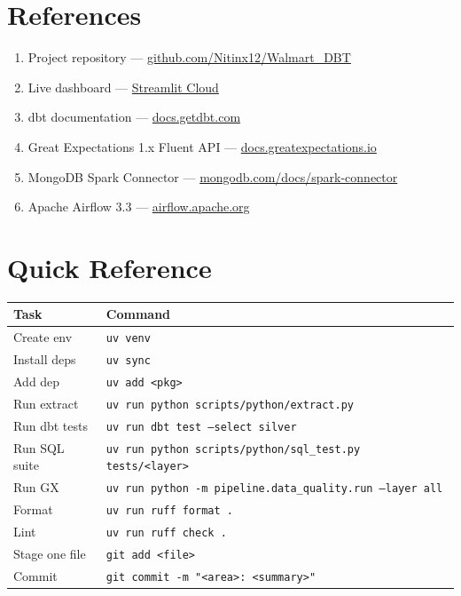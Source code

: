 \documentclass[11pt,a4paper]{article}
\begin{document}
\section*{References}
\begin{enumerate}[leftmargin=1.6em,itemsep=2pt]
  \item Project repository — \href{https://github.com/Nitinx12/Walmart_DBT}{github.com/Nitinx12/Walmart\_DBT}
  \item Live dashboard — \href{https://walmartdbt-b3fdfqwyky3ghzr5syyxtu.streamlit.app/}{Streamlit Cloud}
  \item dbt documentation — \href{https://docs.getdbt.com}{docs.getdbt.com}
  \item Great Expectations 1.x Fluent API — \href{https://docs.greatexpectations.io}{docs.greatexpectations.io}
  \item MongoDB Spark Connector — \href{https://www.mongodb.com/docs/spark-connector/}{mongodb.com/docs/spark-connector}
  \item Apache Airflow 3.3 — \href{https://airflow.apache.org/docs/apache-airflow/3.3.0/}{airflow.apache.org}
\end{enumerate}

\appendix
\section{Quick Reference}

\begin{center}
\begin{longtable}{l l}
\toprule
Task & Command \\
\midrule
\endhead
Create env & \texttt{uv venv} \\
Install deps & \texttt{uv sync} \\
Add dep & \texttt{uv add <pkg>} \\
Run extract & \texttt{uv run python scripts/python/extract.py} \\
Run dbt tests & \texttt{uv run dbt test --select silver} \\
Run SQL suite & \texttt{uv run python scripts/python/sql\_test.py tests/<layer>} \\
Run GX & \texttt{uv run python -m pipeline.data\_quality.run --layer all} \\
Format & \texttt{uv run ruff format .} \\
Lint & \texttt{uv run ruff check .} \\
Stage one file & \texttt{git add <file>} \\
Commit & \texttt{git commit -m "<area>: <summary>"} \\
\bottomrule
\end{longtable}
\end{center}
\end{document}
